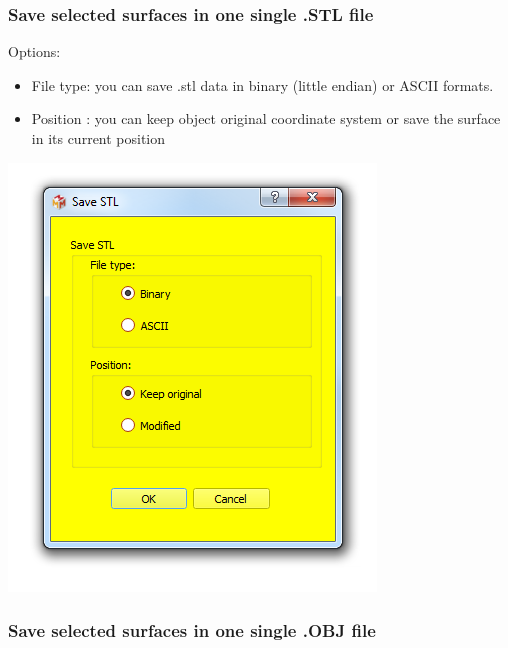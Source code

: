 \subsubsection{Save selected surfaces in one single .STL file}

\begin{minipage}{0.5\textwidth}
Options:
\begin{itemize}
\item File type: you can save .stl data in binary (little endian) or
ASCII formats.

\item Position : you can keep object original coordinate system or save the surface in its current position
\end{itemize}

\end{minipage}    
\begin{minipage}{0.5\textwidth}\centering
  \includegraphics[scale=0.5]{images/07/surface/save_stl.png}
 \end{minipage} 

\subsubsection{Save selected surfaces in one single .OBJ file}

